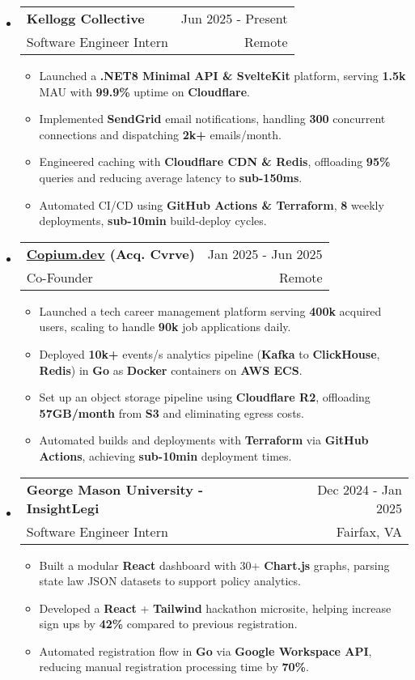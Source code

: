 \documentclass[letterpaper,11pt]{article}
\makeatletter
\newcommand{\resumeItem}[1]{
  \item{
    {#1}
  }
}
\newcommand{\resumeSubheading}[4]{
    \item
    \begin{tabular*}{0.985\textwidth}[t]{l@{\extracolsep{\fill}}r@{\hspace{-0.1in}}}
        {\textbf{#1}} & {#2} \\
        #3 &  #4 \\
    \end{tabular*}\vspace{-5pt}
}
\newcommand{\resumeSubHeadingListStart}{\begin{itemize}[leftmargin=0.00in, rightmargin=-0.2in, label={}]\vspace{3pt}}
\newcommand{\resumeSubHeadingListEnd}{\end{itemize}\vspace{-5pt}}
\newcommand{\resumeItemListStart}{\vspace{3pt}\begin{itemize}[leftmargin=0.15in, rightmargin=0.15in]}
\newcommand{\resumeItemListEnd}{\end{itemize}\vspace{-5pt}}
\makeatother
\begin{document}
\resumeSubHeadingListStart
\resumeSubheading
{Kellogg Collective} {Jun 2025 - Present}
{Software Engineer Intern} {Remote}
\resumeItemListStart
\resumeItem{Launched a \textbf{.NET8 Minimal API \& SvelteKit} platform, serving \textbf{1.5k} MAU with \textbf{99.9\%} uptime on \textbf{Cloudflare}.}
\resumeItem{Implemented \textbf{SendGrid} email notifications, handling \textbf{300} concurrent connections and dispatching \textbf{2k+} emails/month.}
\resumeItem{Engineered caching with \textbf{Cloudflare CDN \& Redis}, offloading \textbf{95\%} queries and reducing average latency to \textbf{sub-150ms}.}
\resumeItem{Automated CI/CD using \textbf{GitHub Actions \& Terraform}, \textbf{8} weekly deployments, \textbf{sub-10min} build-deploy cycles.}
\resumeItemListEnd
\resumeSubHeadingListEnd

\resumeSubHeadingListStart
\resumeSubheading
{\href{https://www.copium.dev}{Copium.dev} (Acq. Cvrve)} {Jan 2025 - Jun 2025}
{Co-Founder} {Remote}
\resumeItemListStart
\resumeItem{Launched a tech career management platform serving \textbf{400k} acquired users, scaling to handle \textbf{90k} job applications daily.}
\resumeItem{Deployed \textbf{10k+} events/s analytics pipeline (\textbf{Kafka} to \textbf{ClickHouse}, \textbf{Redis}) in \textbf{Go} as \textbf{Docker} containers on \textbf{AWS ECS}.}
\resumeItem{Set up an object storage pipeline using \textbf{Cloudflare R2}, offloading \textbf{57GB/month} from \textbf{S3} and eliminating egress costs.}
\resumeItem{Automated builds and deployments with \textbf{Terraform} via \textbf{GitHub Actions}, achieving \textbf{sub-10min} deployment times.}
\resumeItemListEnd
\resumeSubHeadingListEnd

\resumeSubHeadingListStart
\resumeSubheading
{George Mason University - InsightLegi} {Dec 2024 - Jan 2025}
{Software Engineer Intern} {Fairfax, VA}
\resumeItemListStart
\resumeItem{Built a modular \textbf{React} dashboard with 30+ \textbf{Chart.js} graphs, parsing state law JSON datasets to support policy analytics.}
\resumeItem{Developed a \textbf{React} + \textbf{Tailwind} hackathon microsite, helping increase sign ups by \textbf{42\%} compared to previous registration.}
\resumeItem{Automated registration flow in \textbf{Go} via \textbf{Google Workspace API}, reducing manual registration processing time by \textbf{70\%}.}
\resumeItemListEnd
\resumeSubHeadingListEnd

\end{document}
